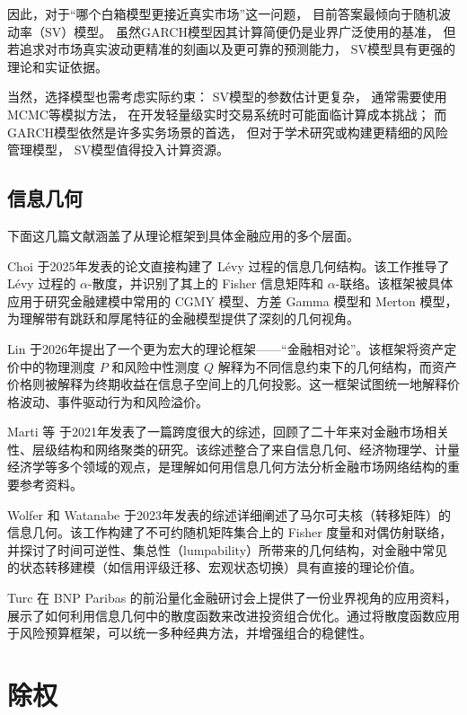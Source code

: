 \documentclass[a4paper,10pt]{article}
\begin{document}
因此，对于“哪个白箱模型更接近真实市场”这一问题，
目前答案最倾向于随机波动率（SV）模型。
虽然GARCH模型因其计算简便仍是业界广泛使用的基准，
但若追求对市场真实波动更精准的刻画以及更可靠的预测能力，
SV模型具有更强的理论和实证依据。

当然，选择模型也需考虑实际约束：
SV模型的参数估计更复杂，
通常需要使用MCMC等模拟方法，
在开发轻量级实时交易系统时可能面临计算成本挑战；
而GARCH模型依然是许多实务场景的首选，
但对于学术研究或构建更精细的风险管理模型，
SV模型值得投入计算资源。


\subsection{信息几何}

下面这几篇文献涵盖了从理论框架到具体金融应用的多个层面。

Choi \cite{Choi2025LevyGeometry} 于2025年发表的论文直接构建了 Lévy 过程的信息几何结构。该工作推导了 Lévy 过程的 $\alpha$-散度，并识别了其上的 Fisher 信息矩阵和 $\alpha$-联络。该框架被具体应用于研究金融建模中常用的 CGMY 模型、方差 Gamma 模型和 Merton 模型，为理解带有跳跃和厚尾特征的金融模型提供了深刻的几何视角。

Lin \cite{Lin2026FinancialRelativity} 于2026年提出了一个更为宏大的理论框架——“金融相对论”。该框架将资产定价中的物理测度 $P$ 和风险中性测度 $Q$ 解释为不同信息约束下的几何结构，而资产价格则被解释为终期收益在信息子空间上的几何投影。这一框架试图统一地解释价格波动、事件驱动行为和风险溢价。

Marti 等 \cite{Marti2021ReviewNetworks} 于2021年发表了一篇跨度很大的综述，回顾了二十年来对金融市场相关性、层级结构和网络聚类的研究。该综述整合了来自信息几何、经济物理学、计量经济学等多个领域的观点，是理解如何用信息几何方法分析金融市场网络结构的重要参考资料。

Wolfer 和 Watanabe \cite{Wolfer2023MarkovGeometry} 于2023年发表的综述详细阐述了马尔可夫核（转移矩阵）的信息几何。该工作构建了不可约随机矩阵集合上的 Fisher 度量和对偶仿射联络，并探讨了时间可逆性、集总性（lumpability）所带来的几何结构，对金融中常见的状态转移建模（如信用评级迁移、宏观状态切换）具有直接的理论价值。

Turc \cite{Turc2024PortfolioGeometry} 在 BNP Paribas 的前沿量化金融研讨会上提供了一份业界视角的应用资料，展示了如何利用信息几何中的散度函数来改进投资组合优化。通过将散度函数应用于风险预算框架，可以统一多种经典方法，并增强组合的稳健性。

\section{除权}
\end{document}
